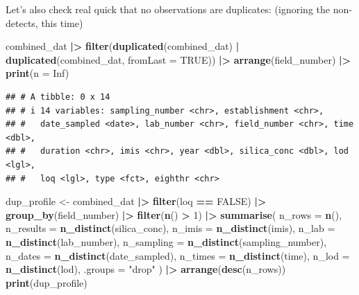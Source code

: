 \documentclass[
]{article}
\newenvironment{Shaded}{\begin{snugshade}}{\end{snugshade}}
\newcommand{\AttributeTok}[1]{\textcolor[rgb]{0.13,0.29,0.53}{#1}}
\newcommand{\ConstantTok}[1]{\textcolor[rgb]{0.56,0.35,0.01}{#1}}
\newcommand{\DecValTok}[1]{\textcolor[rgb]{0.00,0.00,0.81}{#1}}
\newcommand{\FunctionTok}[1]{\textcolor[rgb]{0.13,0.29,0.53}{\textbf{#1}}}
\newcommand{\NormalTok}[1]{#1}
\newcommand{\OtherTok}[1]{\textcolor[rgb]{0.56,0.35,0.01}{#1}}
\newcommand{\SpecialCharTok}[1]{\textcolor[rgb]{0.81,0.36,0.00}{\textbf{#1}}}
\newcommand{\StringTok}[1]{\textcolor[rgb]{0.31,0.60,0.02}{#1}}
\begin{document}
Let's also check real quick that no observations are duplicates:
(ignoring the non-detects, this time)

\begin{Shaded}
\begin{Highlighting}[]
\NormalTok{combined\_dat }\SpecialCharTok{|\textgreater{}} 
  \FunctionTok{filter}\NormalTok{(}\FunctionTok{duplicated}\NormalTok{(combined\_dat) }\SpecialCharTok{|} \FunctionTok{duplicated}\NormalTok{(combined\_dat, }\AttributeTok{fromLast =} \ConstantTok{TRUE}\NormalTok{)) }\SpecialCharTok{|\textgreater{}} 
  \FunctionTok{arrange}\NormalTok{(field\_number) }\SpecialCharTok{|\textgreater{}} 
  \FunctionTok{print}\NormalTok{(}\AttributeTok{n =} \ConstantTok{Inf}\NormalTok{) }
\end{Highlighting}
\end{Shaded}

\begin{verbatim}
## # A tibble: 0 x 14
## # i 14 variables: sampling_number <chr>, establishment <chr>,
## #   date_sampled <date>, lab_number <chr>, field_number <chr>, time <dbl>,
## #   duration <chr>, imis <chr>, year <dbl>, silica_conc <dbl>, lod <lgl>,
## #   loq <lgl>, type <fct>, eighthr <chr>
\end{verbatim}

\begin{Shaded}
\begin{Highlighting}[]
\NormalTok{dup\_profile }\OtherTok{\textless{}{-}}\NormalTok{ combined\_dat }\SpecialCharTok{|\textgreater{}} 
  \FunctionTok{filter}\NormalTok{(loq }\SpecialCharTok{==} \ConstantTok{FALSE}\NormalTok{) }\SpecialCharTok{|\textgreater{}} 
  \FunctionTok{group\_by}\NormalTok{(field\_number) }\SpecialCharTok{|\textgreater{}} 
  \FunctionTok{filter}\NormalTok{(}\FunctionTok{n}\NormalTok{() }\SpecialCharTok{\textgreater{}} \DecValTok{1}\NormalTok{) }\SpecialCharTok{|\textgreater{}} 
  \FunctionTok{summarise}\NormalTok{(}
    \AttributeTok{n\_rows      =} \FunctionTok{n}\NormalTok{(),}
    \AttributeTok{n\_results   =} \FunctionTok{n\_distinct}\NormalTok{(silica\_conc),}
    \AttributeTok{n\_imis      =} \FunctionTok{n\_distinct}\NormalTok{(imis),}
    \AttributeTok{n\_lab       =} \FunctionTok{n\_distinct}\NormalTok{(lab\_number),}
    \AttributeTok{n\_sampling  =} \FunctionTok{n\_distinct}\NormalTok{(sampling\_number),}
    \AttributeTok{n\_dates     =} \FunctionTok{n\_distinct}\NormalTok{(date\_sampled),}
    \AttributeTok{n\_times     =} \FunctionTok{n\_distinct}\NormalTok{(time),}
    \AttributeTok{n\_lod       =} \FunctionTok{n\_distinct}\NormalTok{(lod),}
    \AttributeTok{.groups =} \StringTok{"drop"}
\NormalTok{  ) }\SpecialCharTok{|\textgreater{}} 
  \FunctionTok{arrange}\NormalTok{(}\FunctionTok{desc}\NormalTok{(n\_rows)) }
\FunctionTok{print}\NormalTok{(dup\_profile)}
\end{Highlighting}
\end{Shaded}
\end{document}
